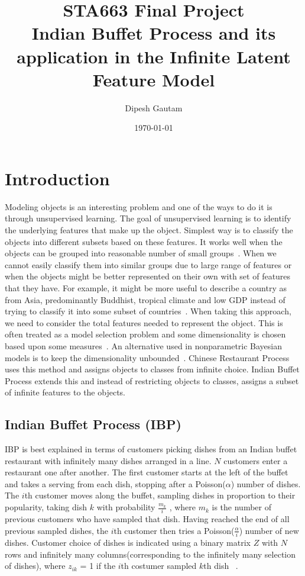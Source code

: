 \documentclass{article}
\begin{document}
\title{STA663 Final Project \\ Indian Buffet Process and its application in the Infinite Latent Feature Model}
\author{Dipesh Gautam}
\date{\today}
\maketitle



\section{Introduction}
Modeling objects is an interesting problem and one of the ways to do it is through unsupervised learning. The goal of unsupervised learning is to identify the underlying features that make up the object. Simplest way is to classify the objects into different subsets based on these features. It works well when the objects can be grouped into reasonable number of small groups~\cite{griffiths}. When we cannot easily classify them into similar groups due to large range of features or when the objects might be better represented on their own with set of features that they have. For example, it might be more useful to describe a country as from Asia, predominantly Buddhist, tropical climate and low GDP instead of trying to classify it into some subset of countries~\cite{griffiths1}. When taking this approach, we need to consider the total features needed to represent the object. This is often treated as a model selection problem and some dimensionality is chosen based upon some measures~\cite{griffiths}. An alternative used in nonparametric Bayesian models is to keep the dimensionality unbounded~\cite{occam}. Chinese Restaurant Process uses this method and assigns objects to classes from infinite choice. Indian Buffet Process extends this and instead of restricting objects to classes, assigns a subset of infinite features to the objects.


\subsection{Indian Buffet Process (IBP)}
IBP is best explained in terms of customers picking dishes from an Indian buffet restaurant with infinitely many dishes arranged in a line. $N$ customers enter a restaurant one after another. The first customer starts at the left of the buffet and takes a serving from each dish, stopping after a Poisson($\alpha$) number of dishes. The $i$th customer moves along the buffet, sampling dishes in proportion to their popularity, taking dish $k$ with probability $\frac{m_k}{i}$ , where $m_k$ is the number of previous customers who have sampled that dish. Having reached the end of all previous sampled dishes, the $i$th customer then tries a Poisson($\frac{\alpha}{i}$) number of new dishes. Customer choice of dishes is indicated using a binary matrix $Z$ with $N$ rows and infinitely many columns(corresponding to the infinitely many selection of dishes), where $z_{ik}$ = 1 if the $i$th costumer sampled $k$th dish ~\cite{griffiths}.
\end{document}
